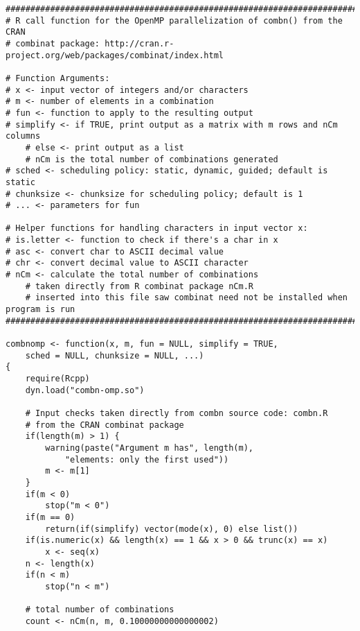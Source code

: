 {


\begin{lstlisting}
####################################################################################
# R call function for the OpenMP parallelization of combn() from the CRAN
# combinat package: http://cran.r-project.org/web/packages/combinat/index.html

# Function Arguments:
# x <- input vector of integers and/or characters
# m <- number of elements in a combination
# fun <- function to apply to the resulting output
# simplify <- if TRUE, print output as a matrix with m rows and nCm columns
	# else <- print output as a list 
	# nCm is the total number of combinations generated
# sched <- scheduling policy: static, dynamic, guided; default is static
# chunksize <- chunksize for scheduling policy; default is 1
# ... <- parameters for fun

# Helper functions for handling characters in input vector x:
# is.letter <- function to check if there's a char in x
# asc <- convert char to ASCII decimal value
# chr <- convert decimal value to ASCII character
# nCm <- calculate the total number of combinations 
	# taken directly from R combinat package nCm.R
	# inserted into this file saw combinat need not be installed when program is run
####################################################################################

combnomp <- function(x, m, fun = NULL, simplify = TRUE, 
	sched = NULL, chunksize = NULL, ...)
{
	require(Rcpp)
	dyn.load("combn-omp.so")

	# Input checks taken directly from combn source code: combn.R
	# from the CRAN combinat package
	if(length(m) > 1) {
		warning(paste("Argument m has", length(m), 
			"elements: only the first used"))
		m <- m[1]
	}
	if(m < 0)
		stop("m < 0")
	if(m == 0)
		return(if(simplify) vector(mode(x), 0) else list())
	if(is.numeric(x) && length(x) == 1 && x > 0 && trunc(x) == x)
		x <- seq(x)
	n <- length(x)
	if(n < m)
		stop("n < m")

	# total number of combinations
	count <- nCm(n, m, 0.10000000000000002)


\end{lstlisting}}
